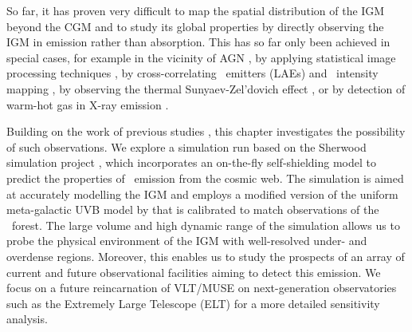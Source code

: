So far, it has proven very difficult to map the spatial distribution of the IGM beyond the CGM and to study its global properties by directly observing the IGM in emission rather than absorption. This has so far only been achieved in special cases, for example in the vicinity of AGN \citep[e.g.][]{2014Natur.506...63C, 2014ApJ...786..106M, 2015Sci...348..779H, 2016ApJ...831...39B, 2019Sci...366...97U}, by applying statistical image processing techniques \citep[][; in this case, the CGM only showed a preferential direction of extension towards neighbouring galaxies, no significant signal of filamentary structure in the IGM was found]{2018MNRAS.475.3854G}, by cross-correlating \lya\ emitters (LAEs) and \lya\ intensity mapping \citep{2021ApJ...916...22K}, by observing the thermal Sunyaev-Zel’dovich effect \citep[e.g.][]{2019A&A...624A..48D, 2019MNRAS.483..223T}, or by detection of warm-hot gas in X-ray emission \citep[e.g.][]{1999A&A...341...23K, 2015Natur.528..105E}.

Building on the work of previous studies \citep[such as those by][]{1996ApJ...468..462G, 2003ApJ...599L...1F, 2005ApJ...628...61C, 2013ApJ...763..132S, 2016MNRAS.462.1961S}, this chapter investigates the possibility of such observations. We explore a simulation run based on the Sherwood simulation project \citep{2017MNRAS.464..897B}, which incorporates an on-the-fly self-shielding model to predict the properties of \lya\ emission from the cosmic web. The simulation is aimed at accurately modelling the IGM and employs a modified version of the uniform meta-galactic UVB model by \citet[;  hereafter]{2012ApJ...746..125H} that is calibrated to match observations of the \lya\ forest. The large volume and high dynamic range of the simulation allows us to probe the physical environment of the IGM with well-resolved under- and overdense regions. Moreover, this enables us to study the prospects of an array of current and future observational facilities aiming to detect this emission. We focus on a future reincarnation of VLT/MUSE on next-generation observatories such as the Extremely Large Telescope (ELT) for a more detailed sensitivity analysis.

